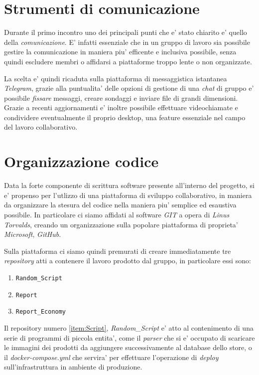 \documentclass[a4paper]{report}
\begin{document}
	\section{Strumenti di comunicazione}\label{strumenti di comunicazione}
		Durante il primo incontro uno dei principali punti che e' stato chiarito e' quello della \emph{comunicazione}.
		E' infatti essenziale che in un gruppo di lavoro sia possibile gestire la comunicazione in maniera piu'
		efficente e inclusiva possibile, senza quindi escludere membri o affidarsi a piattaforme troppo lente o non
		organizzate.
		
		La scelta e' quindi ricaduta sulla piattaforma di messaggistica istantanea \emph{Telegram}, grazie alla
		puntualita' delle opzioni di gestione di una \emph{chat} di gruppo e' possibile \emph{fissare} messaggi, creare
		sondaggi e inviare file di grandi dimensioni. Grazie a recenti aggiornamenti e' inoltre possibile effettuare
		videochiamate e condividere eventualmente il proprio desktop, una feature essenziale nel campo del lavoro
		collaborativo.
	\section{Organizzazione codice}\label{organizzazione codice}
		Data la forte componente di scrittura software presente all'interno del progetto, si e' propenso per l'utlizzo
		di una piattaforma di sviluppo collaborativo, in maniera da organizzare la stesura del codice nella maniera piu'
		semplice ed esaustiva possibile. In particolare ci siamo affidati al software \emph{GIT} a opera di \emph{Linus
		Torvalds}, creando un organizzazione sulla popolare piattaforma di proprieta' \emph{Microsoft}, \emph{GitHub}.

		Sulla piattaforma ci siamo quindi premurati di creare immediatamente tre \emph{repository} atti a contenere il
		lavoro prodotto dal gruppo, in particolare essi sono:
		\begin{enumerate}
			\item \texttt{Random\_Script}\label{item:Script}
			\item \texttt{Report}\label{item:Report}
			\item \texttt{Report\_Economy}\label{item:ReportE}
		\end{enumerate}

		Il repository numero \ref{item:Script}{, \emph{Random\_Script}} e' atto al contenimento di una serie di
		programmi di piccola entita', come il \emph{parser} che si e' occupato di scaricare le immagini dei prodotti da
		aggiungere successivamente al database dello store, o il \emph{docker-compose.yml} che servira' per effettuare l'operazione di \emph{deploy} sull'infrastruttura in ambiente di produzione.
\end{document}
